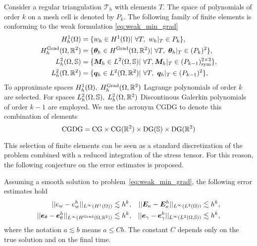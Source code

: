  Consider a regular triangulation $\mathcal{T}_h$ with elements $T$. The space of polynomials of order $k$ on a mesh cell is denoted by $P_k$. The following family of finite elements is conforming to the weak formulation \eqref{eq:weak_min_grad}
\begin{equation}\label{eq:CGDG}
\begin{aligned}
H_{h}^{1}(\Omega) &= \{w_h \in H^1(\Omega) \vert \ \forall T, \ w_h|_{T} \in P_{k} \}, \\
H_h^{\Grad}(\Omega, \bbR^2) &= \{ \bm{\theta}_h \in H^{\Grad}(\Omega, \bbR^2) \vert \ \forall T,\ \bm{\theta}_h|_{T} \in (P_{k})^2 \}, \\
L_h^2(\Omega, \mathbb{S}) &= \{ \bm{M}_h \in L^2(\Omega, \mathbb{S}) \vert \ \forall T, \bm{M}_h|_{T} \in (P_{k-1})^{2 \times 2}_{\text{sym}} \}, \\
L_h^2(\Omega, \bbR^2) &= \{\bm{q}_h \in L^2(\Omega, \bbR^2)  \vert \ \forall T,\ \bm{q}_h|_{T} \in (P_{k-1})^{2} \}, \\
\end{aligned}
\end{equation}
To approximate spaces $H_h^{1}(\Omega), \; H_h^{\operatorname*{Grad}}(\Omega, \mathbb{R}^2)$ Lagrange polynomials of order $k$ are selected. For spaces $L_h^2(\Omega, \mathbb{S}), \; L_h^2(\Omega, \mathbb{R}^2)$ Discontinous Galerkin polynomials of order $k-1$ are employed. We use the acronym CGDG to denote this combination of elements
\[
\mathrm{CGDG} = \mathrm{CG} \times \mathrm{CG}(\mathbb{R}^2) \times \mathrm{DG}(\mathbb{S}) \times \mathrm{DG}(\mathbb{R}^2)
\]

This selection of finite elements can be seen as a standard discretization of the problem combined with a reduced integration of the stress tensor. For this reason, the following conjecture on the error estimates is proposed. 

\begin{conjecture}\label{conj:min}\label{conj:CGDGestimates}
	Assuming a smooth solution to problem~\eqref{eq:weak_min_grad}, the following error estimates hold 
	\begin{equation}
	\label{eq:errCGDG}
	\begin{aligned}
	||e_w - e_w^h||_{L^{\infty}(H^1(\Omega))} &\lesssim h^{k}, \\
	||\bm{e}_\theta - \bm{e}_\theta^h||_{L^{\infty}(H^{\operatorname*{Grad}}(\Omega, \mathbb{R}^2))} &\lesssim h^{k}, \\
	\end{aligned} \quad
	\begin{aligned}
	||\bm{E}_\kappa - \bm{E}_\kappa^h||_{L^{\infty}(L^2(\Omega))} &\lesssim  h^{k}, \\
	||\bm{e}_\gamma - \bm{e}_\gamma^ h||_{L^{\infty}(L^2(\Omega, \mathbb{S}))} &\lesssim  h^{k}, \\
	\end{aligned} 
	\end{equation}
	where the notation $a \lesssim  b$ means $a \le C b$. The constant $C$ depends only on the true solution and on the final time.
\end{conjecture}


